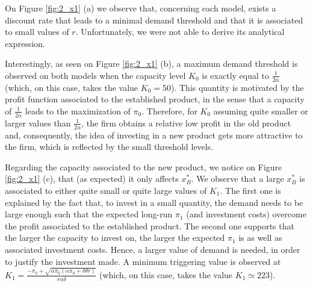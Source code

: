 On Figure \ref{fig:2_x1} (a) we observe that, concerning each model, exists a discount rate that leads to a minimal demand threshold and that it is associated to small values of $r$. Unfortunately, we were not able to derive its analytical expression.

Interestingly, as seen on Figure \ref{fig:2_x1} (b), 
a maximum demand threshold is observed on both models when the capacity level $K_0$ is exactly equal to $\frac{1}{2 \alpha}$ (which, on this case, takes the value $K_0=50$). This quantity is motivated by the profit function associated to the established product, in the sense that a capacity of $\frac{1}{2 \alpha}$ leads to the maximization of $\pi_0$. Therefore, for $K_0$ assuming quite smaller or larger values than $\frac{1}{2 \alpha}$, the firm obtains a relative low profit in the old product and, consequently, the idea of investing in a new product gets more attractive to the firm, which is reflected by the small threshold levels.


Regarding the capacity associated to the new product, we notice on Figure \ref{fig:2_x1} (c), that (as expected) it only affects $x_B^*$. We observe that a large $x_B^*$ is associated to either quite small or quite large values of $K_1$. The first one is explained by the fact that, to invest in a small quantity, the demand needs to be large enough such that the expected long-run $\pi_1$ (and investment costs) overcome the profit associated to the established product. The second one supports that the larger the capacity to invest on, the larger the expected $\pi_1$ is as well as associated investment costs. Hence, a larger value of demand is needed, in order to justify the investment made. A minimum triggering value is observed at $K_1=\frac{-\pi_0+\sqrt{\alpha \pi_0(\alpha \pi_0+\delta \theta r)}}{r\alpha \delta}$ (which, on this case, takes the value $K_1\simeq  223$).

	
